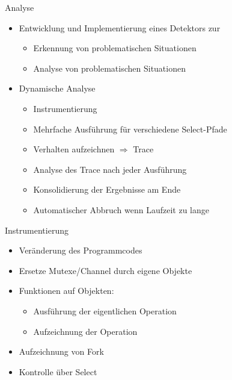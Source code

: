 \documentclass[aspectratio=169]{beamer}  %
\begin{document}
\begin{frame}{Analyse}
  \begin{itemize}
    \item Entwicklung und Implementierung eines Detektors zur
    \begin{itemize}
      \item Erkennung von problematischen Situationen
      \item Analyse von problematischen Situationen 
    \end{itemize}
    \item<2> Dynamische Analyse
    \begin{itemize}
      \item<2> Instrumentierung
      \item<2> Mehrfache Ausführung für verschiedene Select-Pfade
      \item<2> Verhalten aufzeichnen $\Rightarrow$ Trace
      \item<2> Analyse des Trace nach jeder Ausführung
      \item<2> Konsolidierung der Ergebnisse am Ende
      \item<2> Automatischer Abbruch wenn Laufzeit zu lange
    \end{itemize}
  \end{itemize}  
\end{frame}





\begin{frame}{Instrumentierung}
  \begin{itemize}
    \item Veränderung des Programmcodes
    \item Ersetze Mutexe/Channel durch eigene Objekte
    \item Funktionen auf Objekten:
    \begin{itemize}
      \item Ausführung der eigentlichen Operation
      \item Aufzeichnung der Operation
    \end{itemize}
    \item Aufzeichnung von Fork
    \item Kontrolle über Select
  \end{itemize}
\end{frame}
\end{document}
